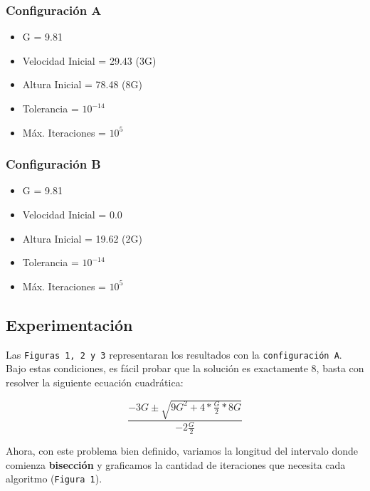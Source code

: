 \documentclass[a4paper]{article}
\begin{document}
\subsubsection{Configuración A} 
\begin{itemize}
  \item{G = 9.81}
  \item{Velocidad Inicial = 29.43 (3G)} 
  \item{Altura Inicial = 78.48 (8G)} 
  \item{Tolerancia = $10^{-14}$} 
  \item{Máx. Iteraciones = $10^5$}
\end{itemize}

\subsubsection{Configuración B}
\begin{itemize}
  \item{G = 9.81}
  \item{Velocidad Inicial = 0.0} 
  \item{Altura Inicial = 19.62 (2G)} 
  \item{Tolerancia = $10^{-14}$} 
  \item{Máx. Iteraciones = $10^5$}
\end{itemize}

\newpage

\subsection{Experimentación}
Las \texttt{Figuras 1, 2 y 3} representaran los resultados con la \texttt{configuración A}.
Bajo estas condiciones, es fácil probar que la solución es exactamente 8, basta con resolver la siguiente ecuación cuadrática:

\begin{displaymath}
  \frac{-3G \pm \sqrt{9G^2 + 4*\frac{G}{2}*8G}}{-2\frac{G}{2}}
\end{displaymath}

Ahora, con este problema bien definido, variamos la longitud del intervalo donde comienza \textbf{bisección} y graficamos la cantidad de iteraciones que necesita cada algoritmo (\texttt{Figura 1}).
\end{document}
